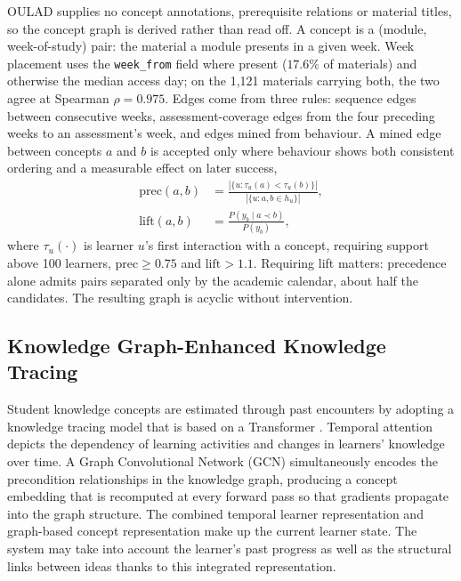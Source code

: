 OULAD supplies no concept annotations, prerequisite relations or material titles, so the
concept graph is derived rather than read off. A concept is a (module, week-of-study)
pair: the material a module presents in a given week. Week placement uses the
\texttt{week\_from} field where present ($17.6\%$ of materials) and otherwise the median
access day; on the 1{,}121 materials carrying both, the two agree at Spearman
$\rho = 0.975$. Edges come from three rules: sequence edges between consecutive weeks,
assessment-coverage edges from the four preceding weeks to an assessment's week, and edges
mined from behaviour. A mined edge between concepts $a$ and $b$ is accepted only where
behaviour shows both consistent ordering and a measurable effect on later success,
%
\begin{equation}
\begin{split}
\mathrm{prec}(a,b) &= \frac{\left|\{u : \tau_u(a) < \tau_u(b)\}\right|}{\left|\{u : a, b \in h_u\}\right|},\\[2pt]
\mathrm{lift}(a,b) &= \frac{P(y_b \mid a \prec b)}{P(y_b)},
\end{split}
\label{eq:mining}
\end{equation}
%
where $\tau_u(\cdot)$ is learner $u$'s first interaction with a concept, requiring support
above 100 learners, $\mathrm{prec} \geq 0.75$ and $\mathrm{lift} > 1.1$. Requiring lift
matters: precedence alone admits pairs separated only by the academic calendar, about half
the candidates. The resulting graph is acyclic without intervention.


\subsection{Knowledge Graph-Enhanced Knowledge Tracing}

Student knowledge concepts are estimated through past encounters by adopting a knowledge
tracing model that is based on a Transformer \cite{vaswani2017attention}. Temporal
attention depicts the dependency of learning activities and changes in learners' knowledge
over time. A Graph Convolutional Network (GCN) \cite{kipf2017gcn} simultaneously encodes
the precondition relationships in the knowledge graph, producing a concept embedding that
is recomputed at every forward pass so that gradients propagate into the graph structure.
The combined temporal learner representation and graph-based concept representation make
up the current learner state. The system may take into account the learner's past progress
as well as the structural links between ideas thanks to this integrated representation.

